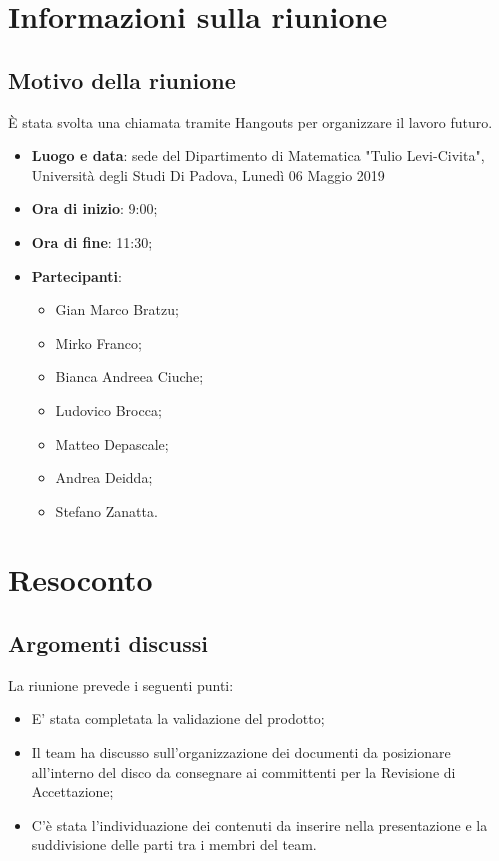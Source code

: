 \documentclass[a4paper,12pt]{article}
\begin{document}
	\tableofcontents
	\cleardoublepage
	\section{Informazioni sulla riunione}
	\subsection{Motivo della riunione} \`{E} stata svolta una chiamata tramite Hangouts per organizzare il lavoro futuro.
	\begin{itemize}
		\item \textbf{Luogo e data}: sede del Dipartimento di Matematica "Tulio Levi-Civita", Università degli Studi Di Padova, Lunedì 06 Maggio 2019
		\item \textbf{Ora di inizio}: 9:00;
		\item \textbf{Ora di fine}: 11:30;
		\item \textbf{Partecipanti}:  
		\begin{itemize}
			\item Gian Marco Bratzu;
			\item Mirko Franco;
			\item Bianca Andreea Ciuche;
			\item Ludovico Brocca;
			\item Matteo Depascale;
			\item Andrea Deidda;
			\item Stefano Zanatta.
		\end{itemize}
	\end{itemize}
	
	
		\section{Resoconto}
	\subsection{Argomenti discussi}
	La riunione prevede i seguenti punti:
	\begin{itemize}		
		\item E' stata completata la validazione del prodotto;
		\item Il team ha discusso sull'organizzazione dei documenti da posizionare all'interno del disco da consegnare ai committenti per la Revisione di Accettazione;
      	\item C'è stata l'individuazione dei contenuti da inserire nella presentazione e la suddivisione delle parti tra i membri del team.
	\end{itemize}
	
\end{document}

